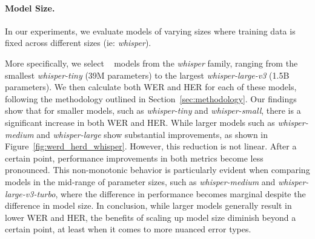 
\paragraph{Model Size.} In our experiments, we evaluate models of varying sizes where training data is fixed across different sizes (ie: \emph{whisper}). 

More specifically, we select \nummodels~ models from the \emph{whisper} family, ranging from the smallest \emph{whisper-tiny} (39M parameters) to the largest \emph{whisper-large-v3} (1.5B parameters). We then calculate both WER and HER for each of these models, following the methodology outlined in Section~\ref{sec:methodology}. Our findings show that for smaller models, such as \emph{whisper-tiny} and \emph{whisper-small}, there is a significant increase in both WER and HER. While larger models such as \emph{whisper-medium} and \emph{whisper-large} show substantial improvements, as shown in Figure~\ref{fig:werd_herd_whisper}. However, this reduction is not linear. After a certain point, performance improvements in both metrics become less pronounced.
This non-monotonic behavior is particularly evident when comparing models in the mid-range of parameter sizes, such as \emph{whisper-medium} and \emph{whisper-large-v3-turbo}, where the difference in performance becomes marginal despite the difference in model size. In conclusion, while larger models generally result in lower WER and HER, the benefits of scaling up model size diminish beyond a certain point, at least when it comes to more nuanced error types. 
